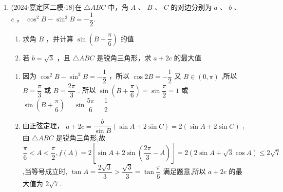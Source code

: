 \begin{enumerate}
    \item (2024$\cdot$嘉定区二模$\cdot$18)在 $\bigtriangleup  {ABC}$ 中，角 $A$ 、 $B$ 、 $C$ 的对边分别为 $a$ 、 $b$ 、 $c$ ， ${\cos }^{2}B - {\sin }^{2}B =  - \dfrac{1}{2}$.
    \begin{enumerate}
        \item 求角 $B$ ，并计算 $\sin \left( {B + \dfrac{\pi }{6}}\right)$ 的值
        \item 若 $b = \sqrt{3}$ ，且 $\bigtriangleup  {ABC}$ 是锐角三角形，求 $a + {2c}$ 的最大值
    \end{enumerate}
    \begin{jieda}
        \begin{enumerate}
            \item 因为 ${\cos }^{2}B - {\sin }^{2}B =  - \dfrac{1}{2}$ ，所以 $\cos {2B} =  - \dfrac{1}{2}$ 又 $B \in  \left( {0,\pi }\right)$ ,所以 $B = \dfrac{\pi }{3}$ 或 $B = \dfrac{2\pi }{3}$ . 所以 $\sin \left( {B + \dfrac{\pi }{6}}\right)  =  \sin \dfrac{\pi }{2} = 1$ 或 $\sin \left( {B + \dfrac{\pi }{6}}\right)  = \sin \dfrac{5\pi }{6} = \dfrac{1}{2}$
            \item 由正弦定理， $a + {2c} = \dfrac{b}{\sin B}\left( {\sin A + 2\sin C}\right)  = 2(\sin A +  2\sin C)$ ,由 $\bigtriangleup {ABC}$ 是锐角三角形,故 $\dfrac{\pi }{6} < A < \dfrac{\pi }{2},f\left( A\right)  =  2\left\lbrack  {\sin A + 2\sin \left( {\dfrac{2\pi }{3} - A}\right) }\right\rbrack   = 2\left( {2\sin A + \sqrt{3}\cos A}\right)  \leq  2\sqrt{7}$ ,当等号成立时, $\tan A = \dfrac{2\sqrt{3}}{3} > \dfrac{\sqrt{3}}{3} = \tan \dfrac{\pi }{6}$ 满足题意,所以 $a + {2c}$ 的最大值为 $2\sqrt{7}$.
        \end{enumerate}
    \end{jieda}


\end{enumerate}
